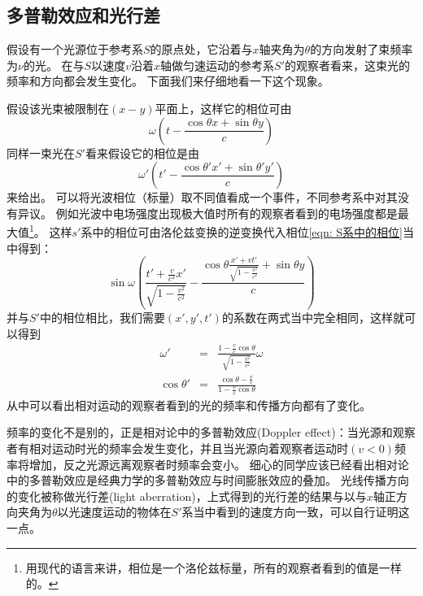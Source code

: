 \subsection{多普勒效应和光行差}
假设有一个光源位于参考系$S$的原点处，它沿着与$x$轴夹角为$\theta$的方向发射了束频率为$\nu$的光。
在与$S$以速度$v$沿着$x$轴做匀速运动的参考系$S'$的观察者看来，这束光的频率和方向都会发生变化。
下面我们来仔细地看一下这个现象。

假设该光束被限制在$(x-y)$平面上，这样它的相位可由
\begin{equation}\label{eqn: S系中的相位}
\omega\left(t-\frac{\cos\theta x+\sin\theta y}{c}\right)
\end{equation}
同样一束光在$S'$看来假设它的相位是由
\begin{equation}
\omega'\left(t'-\frac{\cos\theta' x'+\sin\theta' y'}{c}\right)
\end{equation}
来给出。
可以将光波相位（标量）取不同值看成一个事件，不同参考系中对其没有异议。
例如光波中电场强度出现极大值时所有的观察者看到的电场强度都是最大值\footnote{用现代的语言来讲，相位是一个洛伦兹标量，所有的观察者看到的值是一样的。}。
这样$s'$系中的相位可由洛伦兹变换的逆变换代入相位\ref{eqn: S系中的相位}当中得到：
\begin{equation}
\sin\omega\left(\frac{t'+\frac{v}{c^2}x'}{\sqrt{1-\frac{v^2}{c^2}}}-\frac{\cos\theta \frac{x'+vt'}{\sqrt{1-\frac{v^2}{c^2}}}+\sin\theta y}{c}\right)
\end{equation}
并与$S'$中的相位相比，我们需要$(x',y',t')$的系数在两式当中完全相同，这样就可以得到
\begin{eqnarray}
\omega'&=&\frac{1-\frac{v}{c}\cos\theta}{\sqrt{1-\frac{v^2}{c^2}}}\omega\\
\cos\theta'&=&\frac{\cos\theta-\frac{v}{c}}{1-\frac{v}{c}\cos\theta}
\end{eqnarray}
从中可以看出相对运动的观察者看到的光的频率和传播方向都有了变化。

频率的变化不是别的，正是相对论中的{\heiti 多普勒效应}(Doppler effect)：当光源和观察者有相对运动时光的频率会发生变化，并且当光源向着观察者运动时$(v<0)$频率将增加，反之光源远离观察者时频率会变小。
细心的同学应该已经看出相对论中的多普勒效应是经典力学的多普勒效应与时间膨胀效应的叠加。
光线传播方向的变化被称做{\heiti 光行差}(light aberration)，上式得到的光行差的结果与以与$x$轴正方向夹角为$\theta$以光速度运动的物体在$S'$系当中看到的速度方向一致，可以自行证明这一点。

